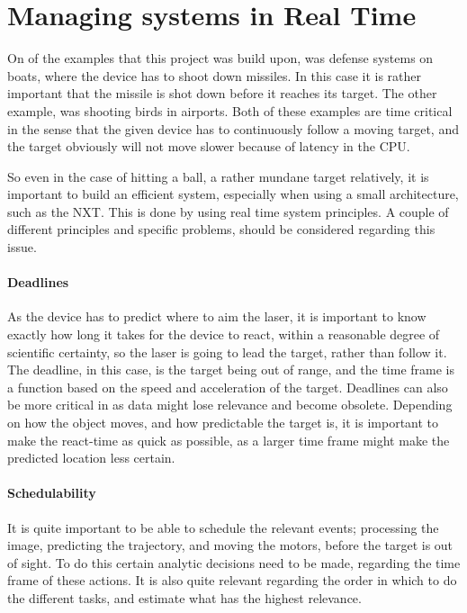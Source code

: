 
\section{Managing systems in Real Time} 
On of the examples that this project was build upon, was defense systems on boats, where the device has to shoot down missiles.
In this case it is rather important that the missile is shot down before it reaches its target.
The other example, was shooting birds in airports.
Both of these examples are time critical in the sense that the given device has to continuously follow a moving target, and the target obviously will not move slower because of latency in the CPU.

So even in the case of hitting a ball, a rather mundane target relatively, it is important to build an efficient system, especially when using a small architecture, such as the NXT.
This is done by using real time system principles.
A couple of different principles and specific problems, should be considered regarding this issue.

\paragraph{Deadlines}
As the device has to predict where to aim the laser, it is important to know exactly how long it takes for the device to react, within a reasonable degree of scientific certainty, so the laser is going to lead the target, rather than follow it. 
The deadline, in this case, is the target being out of range, and the time frame is a function based on the speed and acceleration of the target. 
Deadlines can also be more critical in as data might lose relevance and become obsolete. 
Depending on how the object moves, and how predictable the target is, it is important to make the react-time as quick as possible, as a larger time frame might make the predicted location less certain.

\paragraph{Schedulability}
It is quite important to be able to schedule the relevant events; processing the image, predicting the trajectory, and moving the motors, before the target is out of sight.
To do this certain analytic decisions need to be made, regarding the time frame of these actions. 
It is also quite relevant regarding the order in which to do the different tasks, and estimate what has the highest relevance.

